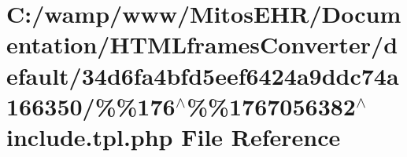 \hypertarget{default_234d6fa4bfd5eef6424a9ddc74a166350_2_06_06176_05_06_061767056382_05include_8tpl_8php}{\section{\-C\-:/wamp/www/\-Mitos\-E\-H\-R/\-Documentation/\-H\-T\-M\-Lframes\-Converter/default/34d6fa4bfd5eef6424a9ddc74a166350/\%\%176$^\wedge$\%\%1767056382$^\wedge$include.tpl.\-php \-File \-Reference}
\label{default_234d6fa4bfd5eef6424a9ddc74a166350_2_06_06176_05_06_061767056382_05include_8tpl_8php}
}
